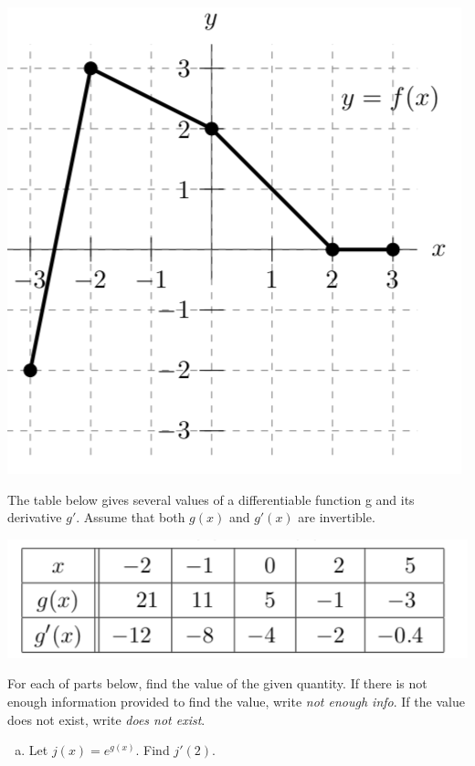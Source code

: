 \documentclass[11pt]{exam}
\begin{document}
\begin{questions}
\begin{multicols}{2}
  \begin{center}
    \includegraphics[scale=0.4]{Figures/graph4.png}
  \end{center}
	\noindent
	The table below gives several values of a differentiable function g and its derivative $g'$.
Assume that both $g(x)$ and $g'(x)$ are invertible.
\begin{center}
  \includegraphics[scale=0.4]{Figures/table4.png}
\end{center}
	\noindent
	For each of parts below, find the value of the given quantity. If there is not enough information provided to find the value, write \emph{not enough info}. If the value does not exist, write \emph{does not exist}.
	\end{multicols}
	\begin{multicols}{2}
	\begin{enumerate}[(a)]
	\item Let $j(x)=e^{g(x)}$. Find $j'(2)$.

\end{enumerate}
\end{multicols}
\end{questions}
\end{document}
